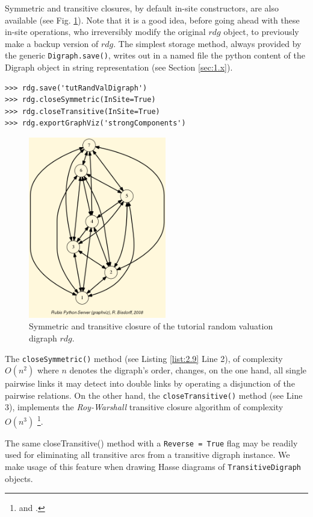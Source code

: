 Symmetric and transitive closures, by default in-site constructors, are also available (see Fig. \ref{fig:2.5}). Note that it is a good idea, before going ahead with these in-site operations, who irreversibly modify the original $rdg$ object, to previously make a backup version of $rdg$. The simplest storage method, always provided by the generic \texttt{Digraph.save()}, writes out in a named file the python content of the Digraph object in string representation (see Section \ref{sec:1.x}).
\begin{lstlisting}[caption={Symmeric and transitive closures},label=list:2.9]
>>> rdg.save('tutRandValDigraph')
>>> rdg.closeSymmetric(InSite=True)
>>> rdg.closeTransitive(InSite=True)
>>> rdg.exportGraphViz('strongComponents')
\end{lstlisting}
\begin{figure}[h]
\sidecaption
\includegraphics[width=6cm]{Figures/strongComponents.png}
\caption{Symmetric and transitive closure of the tutorial random valuation digraph $rdg$.}
\label{fig:2.5}       %
\end{figure}

The \texttt{closeSymmetric()} method (see Listing \ref{list:2.9}  Line 2), of complexity $O(n^2)$ where $n$ denotes the digraph's order, changes, on the one hand, all single pairwise links it may detect into double links by operating a disjunction of the pairwise relations. On the other hand, the \texttt{closeTransitive()} method (see Line 3), implements the \emph{Roy-Warshall} transitive closure algorithm of complexity $O(n^3)$ \footnote{\citet{ROY-1959} and \citet{WAR-1962}.}.

The same closeTransitive() method with a \texttt{Reverse = True} flag may be readily used for eliminating all transitive arcs from a transitive digraph instance. We make usage of this feature when drawing Hasse diagrams of \texttt{TransitiveDigraph} objects.

